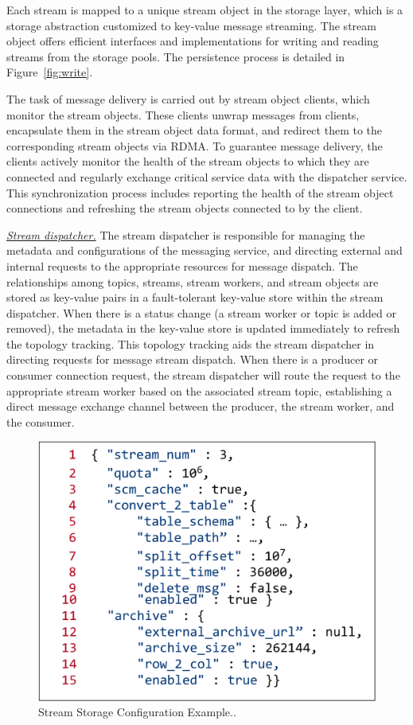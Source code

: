 Each stream is mapped to a unique stream object in the storage layer, which is a  storage abstraction customized to  key-value message streaming. The stream object offers efficient interfaces and implementations for writing and reading streams from the storage pools. The persistence process is detailed in Figure~\ref{fig:write}.

The task of message delivery is carried out by stream object clients, which monitor the stream objects. These clients unwrap messages from clients, encapsulate them in the stream object data format, and redirect them to the corresponding stream objects via RDMA. To guarantee message delivery, the clients actively monitor the health of the stream objects to which they are connected and regularly exchange critical service data with the dispatcher service. This synchronization process includes reporting the health of the stream object connections and refreshing the stream objects connected to by the client.


\noindent\underline{\textit{Stream dispatcher.}} The stream dispatcher is responsible for managing the metadata and configurations of the messaging service, and directing external and internal requests to the appropriate resources for message  dispatch. The relationships among topics, streams, stream workers, and stream objects are stored as key-value pairs in a fault-tolerant key-value store within the stream dispatcher. When there is  a status change   (\eg a stream worker or topic is added or removed), the metadata  in the key-value store is updated immediately to refresh the topology tracking. This topology tracking aids the stream dispatcher in directing requests for message stream dispatch. When there is a producer or consumer connection request, the stream dispatcher will route the request to the appropriate stream worker based on the associated stream topic, establishing a direct message exchange channel between the producer, the stream worker, and the consumer.

\begin{figure}[htbp]
	\includegraphics[scale=0.35]{figures/config}
	\centering
	\vspace{-1em}
	\caption{Stream Storage Configuration Example..}
	\label{fig:config}
	\vspace{-1em}
\end{figure}


